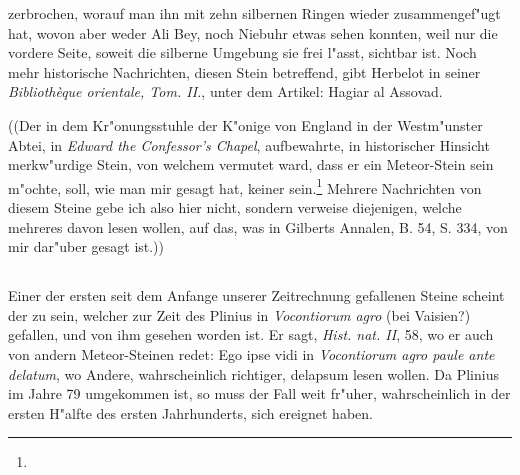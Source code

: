 \documentclass[a4paper, 11pt, oneside, polutonikogreek, german]{article}
\begin{document}
zerbrochen, worauf man ihn mit zehn silbernen Ringen wieder zusammengef"ugt hat, wovon aber weder Ali Bey, noch Niebuhr etwas sehen konnten, weil nur die vordere Seite, soweit die silberne Umgebung sie frei l"asst, sichtbar ist. Noch mehr historische Nachrichten, diesen Stein betreffend, gibt Herbelot in seiner \emph{Bibliothèque orientale, Tom. II.}, unter dem Artikel: Hagiar al Assovad.

((Der in dem Kr"onungsstuhle der K"onige von England in der Westm"unster Abtei, in \emph{Edward the Confessor's Chapel}, aufbewahrte, in historischer Hinsicht merkw"urdige Stein, von welchem vermutet ward, dass er ein Meteor-Stein sein m"ochte, soll, wie man mir gesagt hat, keiner sein.\footnote{} Mehrere Nachrichten von diesem Steine gebe ich also hier nicht, sondern verweise diejenigen, welche mehreres davon lesen wollen, auf das, was in Gilberts Annalen, B. 54, S. 334, von mir dar"uber gesagt ist.))
\subsection{}
\paragraph{}
Einer der ersten seit dem Anfange unserer Zeitrechnung gefallenen Steine scheint der zu sein, welcher zur Zeit des Plinius in \emph{Vocontiorum agro} (bei Vaisien?) gefallen, und von ihm gesehen worden ist. Er sagt, \emph{Hist. nat. II}, 58, wo er auch von andern Meteor-Steinen redet: Ego ipse vidi in \emph{Vocontiorum agro paule ante delatum}, wo Andere, wahrscheinlich richtiger, delapsum lesen wollen. Da Plinius im Jahre 79 umgekommen ist, so muss der Fall weit fr"uher, wahrscheinlich in der ersten H"alfte des ersten Jahrhunderts, sich ereignet haben.
\end{document}
